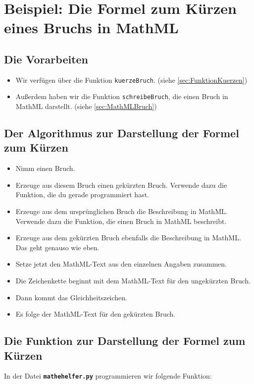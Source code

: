 \section{Beispiel: Die Formel zum Kürzen eines Bruchs in MathML}

\subsection*{Die Vorarbeiten}

\begin{itemize}
	\item Wir verfügen über die Funktion \texttt{kuerzeBruch}. (siehe \ref{sec:FunktionKuerzen})
	\item Außerdem haben wir die Funktion \texttt{schreibeBruch}, die einen Bruch in MathML darstellt. (siehe \ref{sec:MathMLBruch})
\end{itemize}

\subsection*{Der Algorithmus zur Darstellung der Formel zum Kürzen}

\begin{itemize}
	\item Nimm einen Bruch.
	\item Erzeuge aus diesem Bruch einen gekürzten Bruch. Verwende dazu die Funktion, die du gerade programmiert hast.
	\item Erzeuge aus dem ursprünglichen Bruch die Beschreibung in MathML. Verwende dazu die Funktion, die einen Bruch in MathML beschreibt.
	\item Erzeuge aus dem gekürzten Bruch ebenfalls die Beschreibung in MathML. Das geht genauso wie eben.
	\item Setze jetzt den MathML-Text aus den einzelnen Angaben zusammen.
	\item Die Zeichenkette beginnt mit dem MathML-Text für den ungekürzten Bruch.
	\item Dann kommt das Gleichheitszeichen.
	\item Es folge der MathML-Text für den gekürzten Bruch.
\end{itemize}

\subsection*{Die Funktion zur Darstellung der Formel zum Kürzen}

In der Datei \textbf{\texttt{mathehelfer.py}} programmieren wir folgende Funktion:

